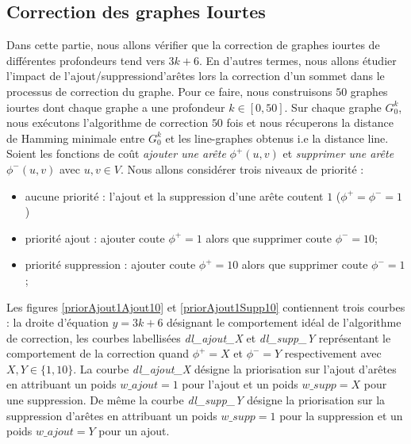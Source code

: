 \documentclass[onecolumn, 12pt]{book}
\begin{document}
\subsection{Correction des graphes Iourtes}
Dans cette partie, nous allons v\'erifier que la correction de graphes iourtes de diff\'erentes profondeurs tend vers $3k+6$.
 En d'autres termes, nous allons \'etudier l'impact de l'ajout/suppressiond'ar\^etes lors la correction d'un sommet dans le processus de correction du graphe.
Pour ce faire, nous construisons $50$ graphes iourtes dont chaque graphe a une profondeur $k \in [0,50]$.
Sur chaque graphe $G_0^k$, nous ex\'ecutons  l'algorithme de correction  $50$ fois et nous r\'ecuperons la distance de Hamming minimale entre $G_0^k$ et les line-graphes obtenus i.e la distance line.
\newline
Soient les fonctions de co\^ut  {\em ajouter une ar\^ete} $\phi^{+}(u,v)$ et {\em supprimer une ar\^ete} $\phi^{-}(u,v)$ avec $u,v \in V$.
Nous allons consid\'erer trois niveaux de priorit\'e :
\begin{itemize}
	\item aucune priorit\'e : l'ajout et la suppression d'une ar\^ete coutent $1$ ($\phi^{+} = \phi^{-} = 1$)
	\item priorit\'e ajout : ajouter coute $\phi^{+} = 1$ alors que supprimer coute $\phi^{-} = 10$; 
	\item priorit\'e suppression : ajouter coute $\phi^{+} = 10$ alors que supprimer coute $\phi^{-} = 1$; 
\end{itemize}
Les figures \ref{priorAjout1Ajout10}  et \ref{priorAjout1Supp10} contiennent trois courbes : la droite d'\'equation $y = 3k+6$ d\'esignant le comportement id\'eal de l'algorithme de correction, les courbes labellis\'ees {\em dl\_ajout\_X} et {\em dl\_supp\_Y}  repr\'esentant le comportement de la correction quand $\phi^{+} = X$ et $\phi^{-} = Y$ respectivement avec $X, Y \in \{1,10\}$. 
La courbe  {\em dl\_ajout\_X} d\'esigne la priorisation sur l'ajout d'ar\^etes en attribuant un poids $w\_ajout = 1$ pour l'ajout et un poids $w\_supp = X$ pour une suppression.
De m\^eme la  courbe  {\em dl\_supp\_Y} d\'esigne la priorisation sur la suppression d'ar\^etes en attribuant un poids $w\_supp = 1$ pour la suppression et un poids $w\_ajout = Y$ pour un ajout.
\end{document}
